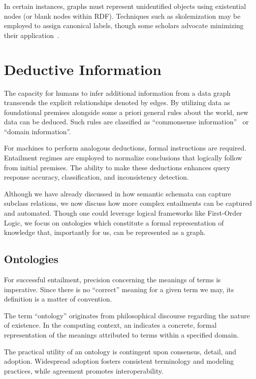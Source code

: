 In certain instances, graphs must represent unidentified objects using existential nodes (or blank nodes within RDF). Techniques such as skolemization may be employed to assign canonical labels, though some scholars advocate minimizing their application~\cite{Cyganiak2014rdf, Hogan2017CanonicalFormsIsomorphicEquivalentRDFGraphs, Longley2019RDFDatasetNormalization}.

\section{Deductive Information}\label{deductive-information}
The capacity for humans to infer additional information from a data graph transcends the explicit relationships denoted by edges. By utilizing data as foundational premises alongside some a priori general rules about the world, new data can be deduced. Such rules are classified as ``commonsense information''~\cite{McCarthy1990FomalizingCommonsense} or ``domain information''.

For machines to perform analogous deductions, formal instructions are required. Entailment regimes are employed to normalize conclusions that logically follow from initial premises. The ability to make these deductions enhances query response accuracy, classification, and inconsistency detection.

Although we have already discussed in  how semantic schemata can capture subclass relations, we now discuss how more complex entailments can be captured and automated. Though one could leverage logical frameworks like First-Order Logic, we focus on ontologies which constitute a formal representation of knowledge that, importantly for us, can be represented as a graph.

\subsection{Ontologies}\label{ontologies}
For successful entailment, precision concerning the meanings of terms is imperative. Since there is no ``correct'' meaning for a given term we may, its definition is a matter of convention.

The term ``ontology'' originates from philosophical discourse regarding the nature of existence. In the computing context, an  indicates a concrete, formal representation of the meanings attributed to terms within a specified domain.

The practical utility of an ontology is contingent upon consensus, detail, and adoption. Widespread adoption fosters consistent terminology and modeling practices, while agreement promotes interoperability.

